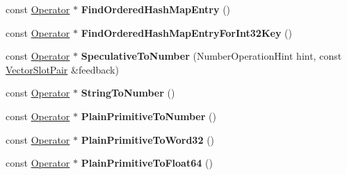 \begin{DoxyCompactItemize}
const \mbox{\hyperlink{classv8_1_1internal_1_1compiler_1_1Operator}{Operator}} $\ast$ {\bfseries Find\+Ordered\+Hash\+Map\+Entry} ()
\item 
\mbox{\label{classv8_1_1internal_1_1compiler_1_1SimplifiedOperatorBuilder_ab0de88195d41976b3cf60460f7bdb8a6}} 
const \mbox{\hyperlink{classv8_1_1internal_1_1compiler_1_1Operator}{Operator}} $\ast$ {\bfseries Find\+Ordered\+Hash\+Map\+Entry\+For\+Int32\+Key} ()
\item 
\mbox{\label{classv8_1_1internal_1_1compiler_1_1SimplifiedOperatorBuilder_ae3031cde7424f85866b6997b15202748}} 
const \mbox{\hyperlink{classv8_1_1internal_1_1compiler_1_1Operator}{Operator}} $\ast$ {\bfseries Speculative\+To\+Number} (Number\+Operation\+Hint hint, const \mbox{\hyperlink{classv8_1_1internal_1_1VectorSlotPair}{Vector\+Slot\+Pair}} \&feedback)
\item 
\mbox{\label{classv8_1_1internal_1_1compiler_1_1SimplifiedOperatorBuilder_af1055ad2ba7eaa702f9820cfe278d0bf}} 
const \mbox{\hyperlink{classv8_1_1internal_1_1compiler_1_1Operator}{Operator}} $\ast$ {\bfseries String\+To\+Number} ()
\item 
\mbox{\label{classv8_1_1internal_1_1compiler_1_1SimplifiedOperatorBuilder_a07ef62c344e8ab4d70109f230311abb1}} 
const \mbox{\hyperlink{classv8_1_1internal_1_1compiler_1_1Operator}{Operator}} $\ast$ {\bfseries Plain\+Primitive\+To\+Number} ()
\item 
\mbox{\label{classv8_1_1internal_1_1compiler_1_1SimplifiedOperatorBuilder_a7a0c85faf5242c349ac8866e267a7ae6}} 
const \mbox{\hyperlink{classv8_1_1internal_1_1compiler_1_1Operator}{Operator}} $\ast$ {\bfseries Plain\+Primitive\+To\+Word32} ()
\item 
\mbox{\label{classv8_1_1internal_1_1compiler_1_1SimplifiedOperatorBuilder_a990dabf53fa3b5856faa0e386826892f}} 
const \mbox{\hyperlink{classv8_1_1internal_1_1compiler_1_1Operator}{Operator}} $\ast$ {\bfseries Plain\+Primitive\+To\+Float64} ()

\end{DoxyCompactItemize}
